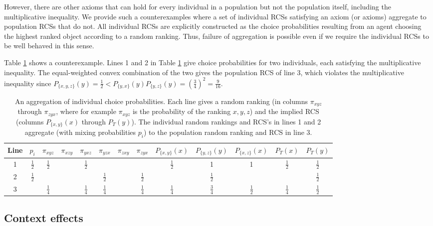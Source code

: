\documentclass[11pt,letter]{article}
\newcommand{\bin}[2]{P_{\{#1,#2\}}(#1)}
\begin{document}
However, there are other axioms that can hold for every individual in a population but not the population itself, including the multiplicative inequality.
We provide such a counterexamples where a set of individual RCSs satisfying an axiom (or axioms) aggregate to population RCSs that do not.
All individual RCSs are explicitly constructed as the choice probabilities resulting from an agent choosing the highest ranked object according to a random ranking.
Thus, failure of aggregation is possible even if we require the individual RCSs to be well behaved in this sense.

Table \ref{t:notconvex} shows a counterexample.
Lines 1 and 2 in Table \ref{t:notconvex} give choice probabilities for two individuals, each satisfying the multiplicative inequality.
The equal-weighted convex combination of the two gives the population RCS of line 3, which violates the multiplicative inequality since $P_{\{x,y,z\}}(y) = \tfrac{1}{2} < \bin{y}{x} \bin{y}{z} = (\tfrac{3}{4})^2 = \tfrac{9}{16}$.

\begin{table}
	\centering
	\def\arraystretch{1.4}
	\begin{tabular}{cc|cccccc|ccccc}
		Line & $p_i$ & $\pi_{xyz}$ & $\pi_{xzy}$ & $\pi_{yxz}$ & $\pi_{yzx}$ & $\pi_{zxy}$ & $\pi_{zyx}$
		& $\bin{x}{y}$ & $\bin{y}{z}$ & $\bin{x}{z}$ & $P_T(x)$ & $P_T(y)$ \\
		\hline
		1 & $\frac{1}{2}$ & $\frac{1}{2}$ & & $\frac{1}{2}$ & & & & $\frac{1}{2}$ & 1 & 1 & $\frac{1}{2}$ & $\frac{1}{2}$ \\
		2 & $\frac{1}{2}$ & & & & $\frac{1}{2}$ & & $\frac{1}{2}$ & & $\frac{1}{2}$ & & & $\frac{1}{2}$ \\
		\hline
		3 & & $\frac{1}{4}$ & & $\frac{1}{4}$ & $\frac{1}{4}$ & & $\frac{1}{4}$ & $\frac{1}{4}$ & $\frac{3}{4}$ & $\frac{1}{2}$ & $\frac{1}{4}$ & $\frac{1}{2}$ \\
		\hline
	\end{tabular}
	\caption{An aggregation of individual choice probabilities.
	Each line gives a random ranking (in columns $\pi_{xyz}$ through $\pi_{zyx}$, where for example $\pi_{xyz}$ is the probability of the ranking $x, y, z$) and the implied RCS (columns $\bin{x}{y}$ through $P_T(y)$).
	The individual random rankings and RCS's in lines 1 and 2 aggregate (with mixing probabilities $p_i$) to the population random ranking and RCS in line 3.}
	\label{t:notconvex}
\end{table}

\subsection{Context effects}
\end{document}
